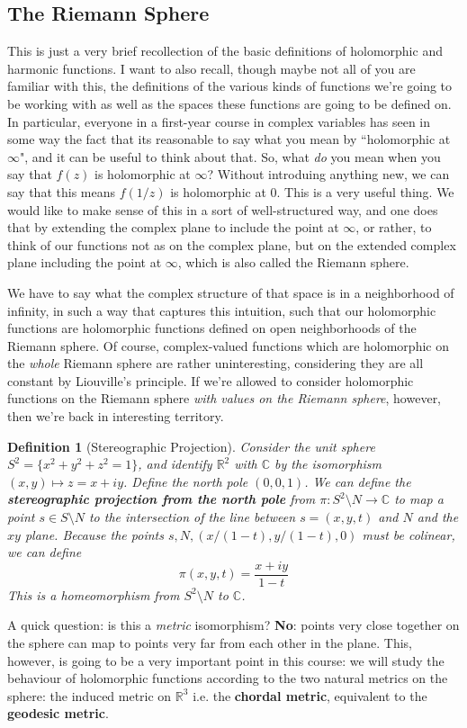 \documentclass{article}
\newcommand{\mbb}[1]{\mathbb{#1}}
\newcommand{\reals}{\mbb{R}}
\newtheorem{definition}{Definition}
\begin{document}
\subsection{The Riemann Sphere}

This is just a very brief recollection of the basic definitions of holomorphic and harmonic functions. I want to also recall, though maybe not all of you are familiar with this, the definitions of the various kinds of functions we're going to be working with as well as the spaces these functions are going to be defined on. In particular, everyone in a first-year course in complex variables has seen in some way the fact that its reasonable to say what you mean by ``holomorphic at \(\infty\)", and it can be useful to think about that. So, what \textit{do} you mean when you say that \(f(z)\) is holomorphic at \(\infty\)? Without introduing anything new, we can say that this means \(f(1/z)\) is holomorphic at \(0\). This is a very useful thing. We would like to make sense of this in a sort of well-structured way, and one does that by extending the complex plane to include the point at \(\infty\), or rather, to think of our functions not as on the complex plane, but on the extended complex plane including the point at \(\infty\), which is also called the Riemann sphere.

We have to say what the complex structure of that space is in a neighborhood of infinity, in such a way that captures this intuition, such that our holomorphic functions are holomorphic functions defined on open neighborhoods of the Riemann sphere.
Of course, complex-valued functions which are holomorphic on the \textit{whole} Riemann sphere are rather uninteresting, considering they are all constant by Liouville's principle. If we're allowed to consider holomorphic functions on the Riemann sphere \textit{with values on the Riemann sphere}, however, then we're back in interesting territory.

\begin{definition}[Stereographic Projection]
Consider the unit sphere \(S^2 = \{x^2 + y^2 + z^2 = 1\}\), and identify \(\reals^2\) with \(\mbb{C}\) by the isomorphism \((x, y) \mapsto z = x + iy\). Define the north pole \((0, 0, 1)\). We can define the \textbf{stereographic projection from the north pole} from \(\pi: S^2 \setminus N \to \mbb{C}\) to map a point \(s \in S \setminus N\) to the intersection of the line between \(s = (x, y, t)\) and \(N\) and the \(xy\) plane. Because the points \(s, N, (x/(1 - t), y/(1 - t), 0)\) must be colinear, we can define
\begin{equation}\pi(x, y, t) = \frac{x + iy}{1 - t}\end{equation}
This is a homeomorphism from \(S^2 \setminus N\) to \(\mbb{C}\).
\end{definition}
A quick question: is this a \textit{metric} isomorphism? \textbf{No}: points very close together on the sphere can map to points very far from each other in the plane. This, however, is going to be a very important point in this course: we will study the behaviour of holomorphic functions according to the two natural metrics on the sphere: the induced metric on \(\reals^3\) i.e. the \textbf{chordal metric}, equivalent to the \textbf{geodesic metric}.
\end{document}
